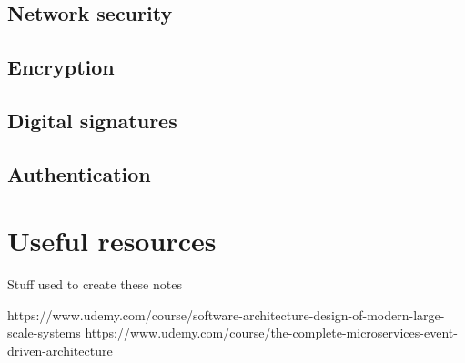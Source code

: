 \documentclass[a4paper, 11pt]{book}
\begin{document}
    \section{Network security}


    \section{Encryption}


    \section{Digital signatures}


    \section{Authentication}


    \chapter{Useful resources}
    Stuff used to create these notes

    https://www.udemy.com/course/software-architecture-design-of-modern-large-scale-systems
    https://www.udemy.com/course/the-complete-microservices-event-driven-architecture

    \newpage

\end{document}
